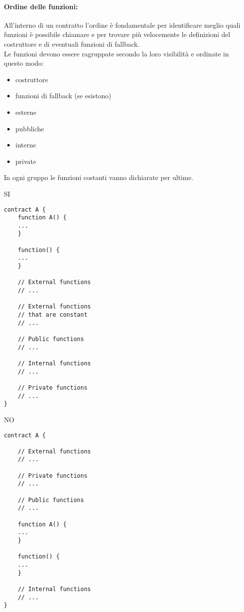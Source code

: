 \documentclass[../processi_primari.tex]{subfiles}
\begin{document}
\paragraph*{Ordine delle funzioni: }
All'interno di un contratto l'ordine è fondamentale per identificare meglio quali funzioni è possibile chiamare e per trovare più velocemente le definizioni del costruttore e di eventuali funzioni di fallback.\\

Le funzioni devono essere ragruppate secondo la loro visibilità e ordinate in questo modo:
\begin{itemize}
	\item costruttore
	\item funzioni di fallback (se esistono)
	\item esterne
	\item pubbliche
	\item interne
	\item private
\end{itemize}
In ogni gruppo le funzioni costanti vanno dichiarate per ultime.\\

\begin{minipage}{6.5cm}
{\begin{center}SI\end{center}}
\begin{Verbatim}[frame=single]
contract A {
	function A() {
	...
	}
	
	function() {
	...
	}
	
	// External functions
	// ...
	
	// External functions 
	// that are constant
	// ...
	
	// Public functions
	// ...
	
	// Internal functions
	// ...
	
	// Private functions
	// ...
}
\end{Verbatim}
\end{minipage}
\hfill
\begin{minipage}{6.5cm}
{\begin{center}NO\end{center}}
\begin{Verbatim}[frame=single]
contract A {

	// External functions
	// ...
	
	// Private functions
	// ...
	
	// Public functions
	// ...
	
	function A() {
	...
	}
	
	function() {
	...
	}
	
	// Internal functions
	// ...
}



\end{Verbatim}
\end{minipage}
\end{document}
